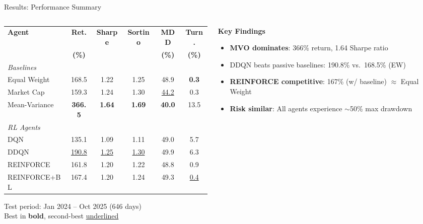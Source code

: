 \documentclass[aspectratio=169]{beamer}
\begin{document}
\begin{frame}{Results: Performance Summary}

\begin{columns}[T]
\begin{column}{0.55\textwidth}
\centering
\scriptsize
\begin{tabular}{@{}lccccc@{}}
\toprule
\textbf{Agent} & \textbf{Ret.} & \textbf{Sharpe} & \textbf{Sortino} & \textbf{MDD} & \textbf{Turn.} \\
 & \textbf{(\%)} & & & \textbf{(\%)} & \textbf{(\%)} \\
\midrule
\multicolumn{6}{l}{\textit{Baselines}} \\
Equal Weight     & 168.5 & 1.22 & 1.25 & 48.9 & \textbf{0.3} \\
Market Cap       & 159.3 & 1.24 & 1.30 & \underline{44.2} & 0.3 \\
Mean-Variance    & \textbf{366.5} & \textbf{1.64} & \textbf{1.69} & \textbf{40.0} & 13.5 \\
\midrule
\multicolumn{6}{l}{\textit{RL Agents}} \\
DQN              & 135.1 & 1.09 & 1.11 & 49.0 & 5.7 \\
DDQN             & \underline{190.8} & \underline{1.25} & \underline{1.30} & 49.9 & 6.3 \\
REINFORCE        & 161.8 & 1.20 & 1.22 & 48.8 & 0.9 \\
REINFORCE+BL     & 167.4 & 1.20 & 1.24 & 49.3 & \underline{0.4} \\
\bottomrule
\end{tabular}

\vspace{0.3em}
\tiny
Test period: Jan 2024 -- Oct 2025 (646 days)\\
Best in \textbf{bold}, second-best \underline{underlined}
\end{column}

\hfill

\begin{column}{0.42\textwidth}
\textbf{Key Findings}
\small
\begin{itemize}\setlength{\itemsep}{8pt}
  \item \textbf{MVO dominates}: 366\% return, 1.64 Sharpe ratio
  \item \alert{DDQN beats passive baselines}: 190.8\% vs.\ 168.5\% (EW)
  \item \textbf{REINFORCE competitive}: 167\% (w/ baseline) $\approx$ Equal Weight
  \item \textbf{Risk similar}: All agents experience $\sim$50\% max drawdown
\end{itemize}
\end{column}
\end{columns}

\end{frame}
\end{document}
